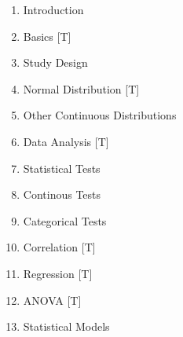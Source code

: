 \begin{enumerate}
  \item Introduction
  \item Basics [T]
  \item Study Design
  \item Normal Distribution [T]
  \item Other Continuous Distributions
  \item Data Analysis [T]
  \item Statistical Tests
  \item Continous Tests
  \item Categorical Tests
  \item Correlation [T]
  \item Regression [T]
  \item ANOVA [T]
  \item Statistical Models
\end{enumerate}
